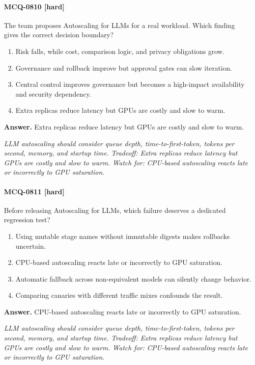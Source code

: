 \paragraph{MCQ-0810 [hard]} The team proposes Autoscaling for LLMs for a real workload. Which finding gives the correct decision boundary?
\begin{enumerate}[label=\Alph*.]
\item Risk falls, while cost, comparison logic, and privacy obligations grow.
\item Governance and rollback improve but approval gates can slow iteration.
\item Central control improves governance but becomes a high-impact availability and security dependency.
\item Extra replicas reduce latency but GPUs are costly and slow to warm.
\end{enumerate}
\noindent\textbf{Answer.} Extra replicas reduce latency but GPUs are costly and slow to warm.
\par\textit{LLM autoscaling should consider queue depth, time-to-first-token, tokens per second, memory, and startup time. Tradeoff: Extra replicas reduce latency but GPUs are costly and slow to warm. Watch for: CPU-based autoscaling reacts late or incorrectly to GPU saturation.}
\paragraph{MCQ-0811 [hard]} Before releasing Autoscaling for LLMs, which failure deserves a dedicated regression test?
\begin{enumerate}[label=\Alph*.]
\item Using mutable stage names without immutable digests makes rollbacks uncertain.
\item CPU-based autoscaling reacts late or incorrectly to GPU saturation.
\item Automatic fallback across non-equivalent models can silently change behavior.
\item Comparing canaries with different traffic mixes confounds the result.
\end{enumerate}
\noindent\textbf{Answer.} CPU-based autoscaling reacts late or incorrectly to GPU saturation.
\par\textit{LLM autoscaling should consider queue depth, time-to-first-token, tokens per second, memory, and startup time. Tradeoff: Extra replicas reduce latency but GPUs are costly and slow to warm. Watch for: CPU-based autoscaling reacts late or incorrectly to GPU saturation.}
